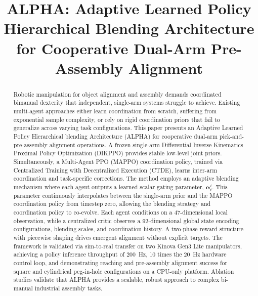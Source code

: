 \documentclass[lettersize,journal]{IEEEtran}
\begin{document}
\title{ALPHA: Adaptive Learned Policy Hierarchical Blending Architecture for Cooperative Dual-Arm Pre-Assembly Alignment}

%

\maketitle

\begin{abstract}
Robotic manipulation for object alignment and assembly demands coordinated bimanual dexterity that independent, single-arm systems struggle to achieve. Existing multi-agent approaches either learn coordination from scratch, suffering from exponential sample complexity, or rely on rigid coordination priors that fail to generalize across varying task configurations. This paper presents an Adaptive Learned Policy Hierarchical blending Architecture (ALPHA) for cooperative dual-arm pick-and-pre-assembly alignment operations. A frozen single-arm Differential Inverse Kinematics Proximal Policy Optimization (DIKPPO) provides stable low-level joint priors. Simultaneously, a Multi-Agent PPO (MAPPO) coordination policy, trained via Centralized Training with Decentralized Execution (CTDE), learns inter-arm coordination and task-specific corrections. The method employs an adaptive blending mechanism where each agent outputs a learned scalar gating parameter, $\mathbf{\alpha}^{i}_{t}$. This parameter continuously interpolates between the single-arm prior and the MAPPO coordination policy from timestep zero, allowing the blending strategy and coordination policy to co-evolve. Each agent conditions on a 47-dimensional local observation, while a centralized critic observes a 92-dimensional global state encoding configurations, blending scales, and coordination history. A two-phase reward structure with piecewise shaping drives emergent alignment without explicit targets. The framework is validated via sim-to-real transfer on two Kinova Gen3 Lite manipulators, achieving a policy inference throughput of 200~Hz, 10 times the 20~Hz hardware control loop, and demonstrating  reaching and pre-assembly alignment success for square and cylindrical peg-in-hole configurations on a CPU-only platform. Ablation studies validate that ALPHA provides a scalable, robust approach to complex bi-manual industrial assembly tasks.
\end{abstract}
\end{document}
